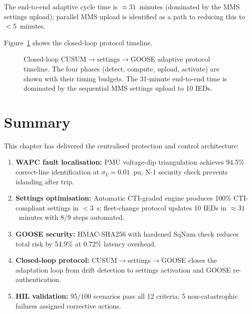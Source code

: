 The end-to-end adaptive cycle time is $\approx 31$~minutes (dominated
by the MMS settings upload); parallel MMS upload is identified as a
path to reducing this to $< 5$~minutes.

Figure~\ref{fig:ch9_closedloop} shows the closed-loop protocol timeline.

\begin{figure}[htbp]
  \centering
  
  \caption{Closed-loop CUSUM$\to$settings$\to$GOOSE adaptive protocol
           timeline. The four phases (detect, compute, upload, activate)
           are shown with their timing budgets.
           The 31-minute end-to-end time is dominated by the sequential
           MMS settings upload to 10 IEDs.}
  \label{fig:ch9_closedloop}
\end{figure}

\section{Summary}
\label{sec:ch11_summary}

This chapter has delivered the centralised protection and control architecture:
\begin{enumerate}
\item \textbf{WAPC fault localisation:} PMU voltage-dip triangulation
      achieves 94.5\% correct-line identification at $\sigma_V = 0.01$~pu;
      N-1 security check prevents islanding after trip.
\item \textbf{Settings optimisation:} Automatic CTI-graded engine
      produces 100\% CTI-compliant settings in $< 3$~s; fleet-change
      protocol updates 10 IEDs in $\approx 31$~minutes with 8/9 steps automated.
\item \textbf{GOOSE security:} HMAC-SHA256 with hardened SqNum
      check reduces total risk by 54.9\% at 0.72\% latency overhead.
\item \textbf{Closed-loop protocol:} CUSUM$\to$settings$\to$GOOSE
      closes the adaptation loop from drift detection to settings activation
      and GOOSE re-authentication.
\item \textbf{HIL validation:} 95/100 scenarios pass all 12 criteria;
      5 non-catastrophic failures assigned corrective actions.
\end{enumerate}




